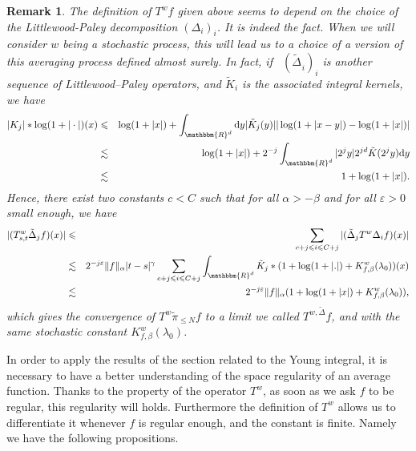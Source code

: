 \documentclass[a4paper,11pt]{article}
\newcommand{\mathd}{\mathrm{d}}
\newcommand{\nocomma}{}
\newtheorem{remark}[theorem]{Remark}
\begin{document}
\begin{remark}
  The definition of $T^{w} f$ given above seems to depend on the choice of the
  Littlewood-Paley decomposition $( \Delta_{i} )_{i}$. It is indeed the fact.
  When we will consider $w$ being a stochastic process, this will lead us to a
  choice of a version of this averaging process defined almost surely. In
  fact, if \ $( \widetilde{\Delta_{}}_{i} )_{i}$ is another sequence of
  Littlewood--Paley operators, and $\tilde{K}_{i}$ is the associated integral
  kernels, we have
  \begin{eqnarray*}
    | K_{j} | \ast \log ( 1+ | \cdot | ) ( x ) & \leqslant & \log ( 1+ | x | ) +
    \int_{\mathbbm{R}^{d}} \mathd y  | \tilde{K}_{j} ( y ) | | \log ( 1+ | x-y
    | ) - \log ( 1+ | x | ) |\\
    & \lesssim & \log ( 1+ | x | ) +2^{-j} \int_{\mathbbm{R}^{d}} | 2^{j} y |
    2^{j d} \tilde{K} ( 2^{j} y ) \mathd y\\
    & \lesssim & 1+ \log ( 1+ | x | ).
  \end{eqnarray*}
  Hence, there exist two constants $c<C$ such that for all $\alpha >- \beta$ and for all $\varepsilon >0$ small enough,
  we have
  \begin{eqnarray*}
    | ( T^{w}_{s,t} \tilde{\Delta}_{j} f ) ( x ) | & \leqslant & \sum_{c + j \leqslant i
    \leqslant C + j} | ( \tilde{\Delta}_{j} T^{w} \Delta_{i} f ) ( x ) |\\
    & \lesssim & 2^{-j \varepsilon} \| f \|_{\alpha} | t-s |^{\gamma} \sum_{c + j \leqslant i
    \leqslant C + j} \int_{\mathbbm{R}^{d}} \tilde{K}_{j} \ast ( 1+ \log ( 1+ | . | )
    +K_{f, \beta}^{w} ( \lambda_{0} ) ) ( x )\\
    & \lesssim & 2^{-j \varepsilon} \| f \|_{\alpha} ( 1+ \log ( 1+ | x | )
    +K_{f, \beta}^{w} ( \lambda_{0} ) ),
  \end{eqnarray*}
  which gives the convergence of $T^{w} \tilde{\pi}_{\leqslant N} f$ to a
  limit we called $T^{w \nocomma , \tilde{\Delta}} f$, and with the same
  stochastic constant $K_{f, \beta}^{w} ( \lambda_{0} )$.
\end{remark}

In order
 to apply
  the results
   of the
    section
     related
      to the Young
       integral, it is
necessary to have a better understanding of the space regularity of an average
function. Thanks to the property of the operator $T^{w}$, as soon as we ask
$f$ to be regular, this regularity will holds. Furthermore the definition of
$T^{w}$ allows us to differentiate it whenever $f$ is regular enough, and the
constant is finite. Namely we have the following propositions.
\end{document}
